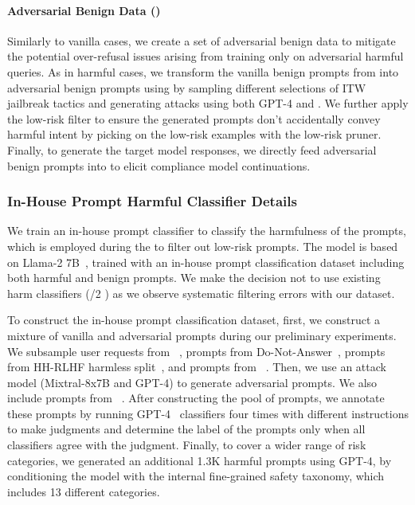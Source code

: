 \paragraph{Adversarial Benign Data (\advb)}
Similarly to vanilla cases, we create a set of adversarial benign data to mitigate the potential over-refusal issues arising from training only on adversarial harmful queries. As in harmful cases, we transform the vanilla benign prompts from \dataset into adversarial benign prompts using \method by sampling different selections of ITW jailbreak tactics and generating attacks using both GPT-4 and \mixtral. We further apply the low-risk filter to ensure the generated prompts don't accidentally convey harmful intent by picking on the low-risk examples with the low-risk pruner. Finally, to generate the target model responses, we directly feed adversarial benign prompts into \chatgpt to elicit compliance model continuations.

\subsubsection{In-House Prompt Harmful Classifier Details}\label{subsec:classifier_details}

We train an in-house prompt classifier to classify the harmfulness of the prompts, which is employed during the \method to filter out low-risk prompts. The model is based on Llama-2 7B~\citep{llama2}, trained with an in-house prompt classification dataset including both harmful and benign prompts. We make the decision not to use existing harm classifiers (\eg {}/2 \cite{llamaguard}) as we observe systematic filtering errors with our dataset.

To construct the in-house prompt classification dataset, first, we construct a mixture of vanilla and adversarial prompts during our preliminary experiments. We subsample user requests from \wildchatshort~\citep{zhao2024inthewildchat}, prompts from Do-Not-Answer~\citep{wang2023donotanswer}, prompts from HH-RLHF harmless split~\citep{hh-rlhf-preference}, and prompts from \safellama~\citep{safetytuned_llama}. Then, we use an attack model (Mixtral-8x7B and GPT-4) to generate adversarial prompts. We also include prompts from \dan~\citep{doanytingnow}. After constructing the pool of prompts, we annotate these prompts by running GPT-4~\citep{openai2024gpt4} classifiers four times with different instructions to make judgments and determine the label of the prompts only when all classifiers agree with the judgment. Finally, to cover a wider range of risk categories, we generated an additional 1.3K harmful prompts using GPT-4, by conditioning the model with the internal fine-grained safety taxonomy, which includes 13 different categories.

